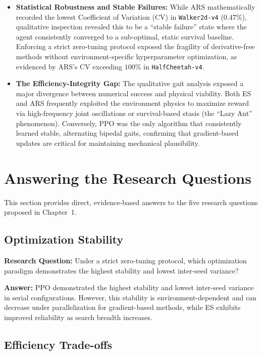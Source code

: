 \begin{itemize}
    \item \textbf{Statistical Robustness and Stable Failures:} While ARS mathematically recorded the lowest Coefficient of Variation (CV) in \texttt{Walker2d-v4} ($0.47\%$), qualitative inspection revealed this to be a ``stable failure'' state where the agent consistently converged to a sub-optimal, static survival baseline. Enforcing a strict zero-tuning protocol exposed the fragility of derivative-free methods without environment-specific hyperparameter optimization, as evidenced by ARS's CV exceeding $100\%$ in \texttt{HalfCheetah-v4}.

    \item \textbf{The Efficiency-Integrity Gap:} The qualitative gait analysis exposed a major divergence between numerical success and physical viability. Both ES and ARS frequently exploited the environment physics to maximize reward via high-frequency joint oscillations or survival-based stasis (the ``Lazy Ant'' phenomenon). Conversely, PPO was the only algorithm that consistently learned stable, alternating bipedal gaits, confirming that gradient-based updates are critical for maintaining mechanical plausibility.
\end{itemize}

\section{Answering the Research Questions}

This section provides direct, evidence-based answers to the five research questions proposed in Chapter~1.

\subsection{Optimization Stability}

\textbf{Research Question:} Under a strict zero-tuning protocol, which optimization paradigm demonstrates the highest stability and lowest inter-seed variance?

\textbf{Answer:} PPO demonstrated the highest stability and lowest inter-seed variance in serial configurations. However, this stability is environment-dependent and can decrease under parallelization for gradient-based methods, while ES exhibits improved reliability as search breadth increases.

\subsection{Efficiency Trade-offs}

